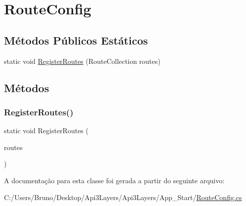 \hypertarget{classApi3Layers_1_1RouteConfig}{}\section{Route\+Config}
\label{classApi3Layers_1_1RouteConfig}
\subsection*{Métodos Públicos Estáticos}
\begin{DoxyCompactItemize}
\item 
static void \hyperlink{classApi3Layers_1_1RouteConfig_a11e22f7991e945338ef5051492f404a9}{Register\+Routes} (Route\+Collection routes)
\end{DoxyCompactItemize}


\subsection{Métodos}
\mbox{\label{classApi3Layers_1_1RouteConfig_a11e22f7991e945338ef5051492f404a9}} 
\subsubsection{\texorpdfstring{Register\+Routes()}{RegisterRoutes()}}
{\footnotesize\ttfamily static void Register\+Routes (\begin{DoxyParamCaption}\item[{Route\+Collection}]{routes }\end{DoxyParamCaption})\hspace{0.3cm}{\ttfamily [static]}}



A documentação para esta classe foi gerada a partir do seguinte arquivo\+:\begin{DoxyCompactItemize}
\item 
C\+:/\+Users/\+Bruno/\+Desktop/\+Api3\+Layers/\+Api3\+Layers/\+App\+\_\+\+Start/\hyperlink{RouteConfig_8cs}{Route\+Config.\+cs}\end{DoxyCompactItemize}
